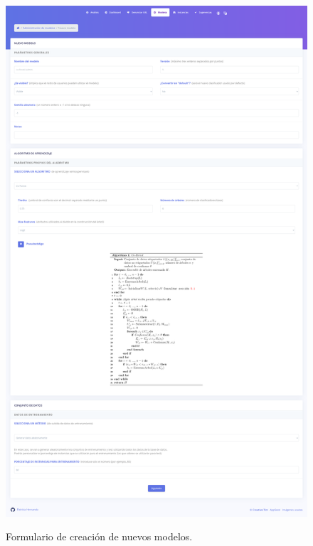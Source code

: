 \begin{figure}[h]
	\caption[Manual de usuario: nuevo modelo]{Formulario de creación de nuevos modelos.}
	\centering
	\includegraphics[width=\textwidth]{../img/anexos/user_guide/5_new_model}
	\label{e-5:new-model}
\end{figure}


